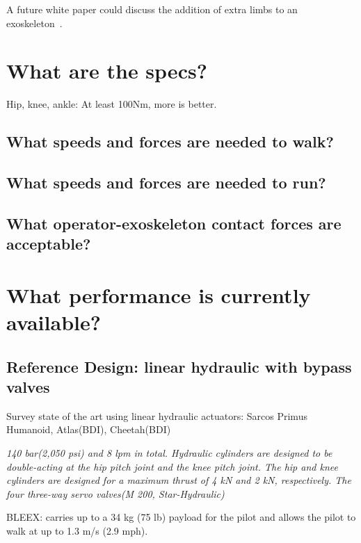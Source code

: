 \documentclass[letterpaper,12pt,fullpage]{article}
\begin{document}
A future white paper could discuss the addition of extra limbs to an
exoskeleton~\cite{IEEE07139896}.





\section{What are the specs?}

Hip, knee, ankle: At least 100Nm, more is better.

\subsection{What speeds and forces are needed to walk?}

\subsection{What speeds and forces are needed to run?}

\subsection{What operator-exoskeleton contact forces are acceptable?}

\section{What performance is currently available?}

\subsection{Reference Design: linear hydraulic with bypass valves}

Survey state of the art using linear hydraulic actuators:
Sarcos Primus Humanoid, Atlas(BDI), Cheetah(BDI)

{\it 140 bar(2,050 psi) and 8 lpm in total. Hydraulic cylinders
are designed to be double-acting at the hip pitch joint and
the knee pitch joint. The hip and knee cylinders are designed
for a maximum thrust of 4 kN and 2 kN, respectively. The
four three-way servo valves(M 200, Star-Hydraulic)}~\cite{IEEE07222598}

BLEEX: carries
up to a 34 kg (75 lb) payload for the pilot and allows the pilot to
walk at up to 1.3 m/s (2.9 mph).
\end{document}
